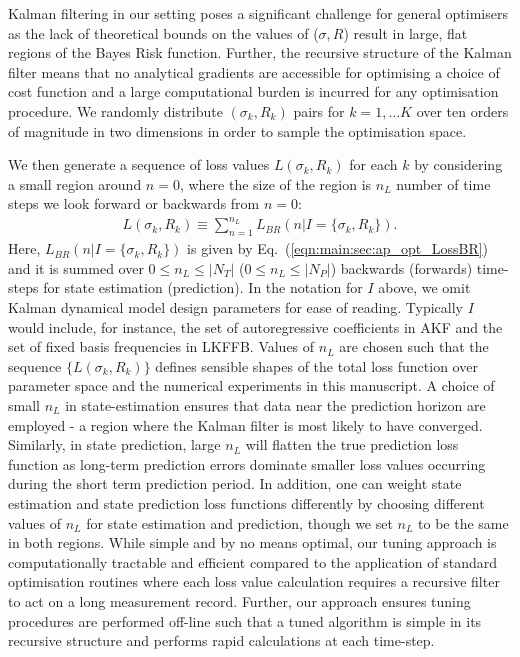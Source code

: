 Kalman filtering in our setting poses a significant challenge for general optimisers as the lack of theoretical bounds on the values of ($\sigma, R$) result in large, flat regions of the Bayes Risk function. Further, the recursive structure of the Kalman filter means that no analytical gradients are accessible for optimising a choice of cost function and a large computational burden is incurred for any optimisation procedure. We randomly distribute $(\sigma_{k}, R_{k})$ pairs for $k=1, \hdots K $ over ten orders of magnitude in two dimensions in order to sample the optimisation space.

We then generate a sequence of loss values $L(\sigma_k, R_k)$ for each $k$ by considering a small region around $n=0$, where the size of the region is $n_L$ number of time steps we look forward or backwards from $n=0$:
\begin{align}
	L(\sigma_k, R_k) \equiv  \sum_{n=1}^{n_L} L_{BR}(n | I= \{\sigma_k, R_k \}) \label{eqn:main:risk:optriskvalue}.
\end{align}
Here, $L_{BR}(n | I= \{\sigma_k, R_k \})$ is given by Eq.~(\ref {eqn:main:sec:ap_opt_LossBR}) and it is summed over $0\leq n_L\leq |N_{T}|$  ($0\leq n_L\leq |N_{P}|$) backwards (forwards) time-steps for state estimation (prediction). In the notation for $I$ above, we omit Kalman dynamical model design parameters for ease of reading.  Typically $I$ would include, for instance, the set of autoregressive coefficients in AKF and the set of fixed basis frequencies in LKFFB. Values of $n_L$ are chosen such that the sequence $\{L(\sigma_k, R_k) \}$ defines sensible shapes of the total loss function over parameter space and the numerical experiments in this manuscript. A choice of small $n_L$ in state-estimation ensures that data near the prediction horizon are employed - a region where the Kalman filter is most likely to have converged.  Similarly, in state prediction, large $n_L$ will flatten the true prediction loss function as long-term prediction errors dominate smaller loss values occurring during the short term prediction period. In addition, one can weight state estimation and state prediction loss functions differently by choosing different values of $n_L$ for state estimation and prediction, though we set $n_L$ to be the same in both regions. While simple and by no means optimal, our tuning approach is computationally tractable and efficient compared to the application of standard optimisation routines where each loss value calculation requires a recursive filter to act on a long measurement record. Further, our approach ensures tuning procedures are performed off-line such that a tuned algorithm is simple in its recursive structure and performs rapid calculations at each time-step.

